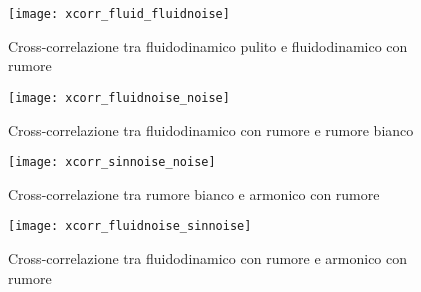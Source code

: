 \documentclass{article} %
\begin{document}
\begin{figure}[h!]
	\begin{minipage}[t]{0.5\textwidth}
		\texttt{[image: xcorr\_fluid\_fluidnoise]}
		\caption{Cross-correlazione tra fluidodinamico pulito e fluidodinamico con rumore}
		\label{fig:xcorr_fluid_fluidnoise}
	\end{minipage}
	\begin{minipage}[t]{0.5\textwidth}
		\texttt{[image: xcorr\_fluidnoise\_noise]}
		\caption{Cross-correlazione tra fluidodinamico con rumore e rumore bianco}
		\label{fig:xcorr_fluidnoise_noise}
	\end{minipage}
\end{figure}
\begin{figure}[h!]
	\begin{minipage}[t]{0.5\textwidth}
		\texttt{[image: xcorr\_sinnoise\_noise]}
		\caption{Cross-correlazione tra rumore bianco e armonico con rumore}
		\label{fig:xcorr_sinnoise_noise}
	\end{minipage}
	\begin{minipage}[t]{0.5\textwidth}
		\texttt{[image: xcorr\_fluidnoise\_sinnoise]}
		\caption{Cross-correlazione tra fluidodinamico con rumore e armonico con rumore}
		\label{fig:xcorr_fluidnoise_sinnoise}
	\end{minipage}
\end{figure}
\clearpage
\end{document}
